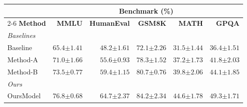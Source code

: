 \documentclass{article}
\begin{document}
\begin{center}
\begin{tabular}{lrrrrr}
\toprule
\multicolumn{1}{c}{} & \multicolumn{5}{c}{\textbf{Benchmark (\%)}}\\
\cmidrule(lr){2-6}
\textbf{Method} & \textbf{MMLU} & \textbf{HumanEval} & \textbf{GSM8K} & \textbf{MATH} & \textbf{GPQA}\\
\midrule
\multicolumn{6}{l}{\textit{Baselines}}\\
Baseline & $65.4{\scriptstyle \pm1.41}$ & $48.2{\scriptstyle \pm1.61}$ & $72.1{\scriptstyle \pm2.26}$ & $31.5{\scriptstyle \pm1.44}$ & $36.4{\scriptstyle \pm1.51}$\\
Method-A & $71.0{\scriptstyle \pm1.66}$ & $55.6{\scriptstyle \pm0.93}$ & $78.3{\scriptstyle \pm1.52}$ & $37.2{\scriptstyle \pm1.73}$ & $41.8{\scriptstyle \pm2.03}$\\
Method-B & $73.5{\scriptstyle \pm0.77}$ & $59.4{\scriptstyle \pm1.15}$ & $80.7{\scriptstyle \pm0.76}$ & $39.8{\scriptstyle \pm2.06}$ & $44.1{\scriptstyle \pm1.85}$\\
\midrule
\multicolumn{6}{l}{\textit{Ours}}\\
OursModel & \textbf{$76.8{\scriptstyle \pm0.68}$} & \textbf{$64.7{\scriptstyle \pm2.37}$} & \textbf{$84.2{\scriptstyle \pm2.34}$} & \textbf{$44.6{\scriptstyle \pm1.78}$} & \textbf{$49.3{\scriptstyle \pm1.71}$}\\
\bottomrule
\end{tabular}
\end{center}
\end{document}
